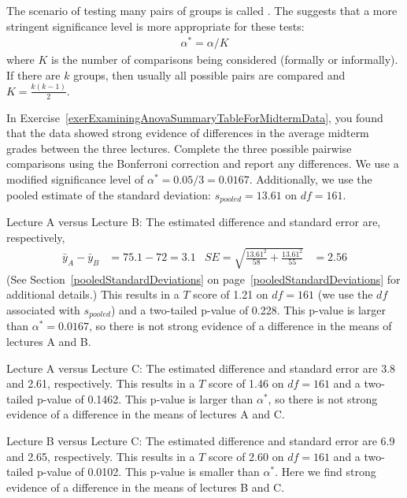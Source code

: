 \begin{termBox}{
The scenario of testing many pairs of groups is called . The  suggests that a more stringent significance level is more appropriate for these tests:
\begin{align*}
\alpha^* = \alpha / K
\end{align*}
where $K$ is the number of comparisons being considered (formally or informally). If there are $k$ groups, then usually all possible pairs are compared and $K=\frac{k(k-1)}{2}$.}
\end{termBox}

\begin{example}{In Exercise~\ref{exerExaminingAnovaSummaryTableForMidtermData}, you found that the data showed strong evidence of differences in the average midterm grades between the three lectures. Complete the three possible pairwise comparisons using the Bonferroni correction and report any differences.} \label{multipleComparisonsOfThreeStatClasses}
We use a modified significance level of $\alpha^* = 0.05/3 = 0.0167$. Additionally, we use the pooled estimate of the standard deviation: $s_{pooled}=13.61$ on $df=161$.

Lecture A versus Lecture B: The estimated difference and standard error are, respectively,
\begin{align*}
\bar{y}_A - \bar{y}_{B} &= 75.1 - 72 = 3.1
	&SE = \sqrt{\frac{13.61^2}{58} + \frac{13.61^2}{55}} &= 2.56
\end{align*}
(See Section~\ref{pooledStandardDeviations} on page~\ref{pooledStandardDeviations} for additional details.) This results in a $T$ score of 1.21 on $df = 161$ (we use the $df$ associated with $s_{pooled}$) and a two-tailed p-value of 0.228. This p-value is larger than $\alpha^*=0.0167$, so there is not strong evidence of a difference in the means of lectures A and B.

Lecture A versus Lecture C: The estimated difference and standard error are 3.8 and 2.61, respectively. This results in a $T$ score of 1.46 on $df = 161$ and a two-tailed p-value of 0.1462. This p-value is larger than $\alpha^*$, so there is not strong evidence of a difference in the means of lectures A and C.

Lecture B versus Lecture C: The estimated difference and standard error are 6.9 and 2.65, respectively. This results in a $T$ score of 2.60 on $df = 161$ and a two-tailed p-value of 0.0102. This p-value is smaller than $\alpha^*$. Here we find strong evidence of a difference in the means of lectures B and C.
\end{example}

